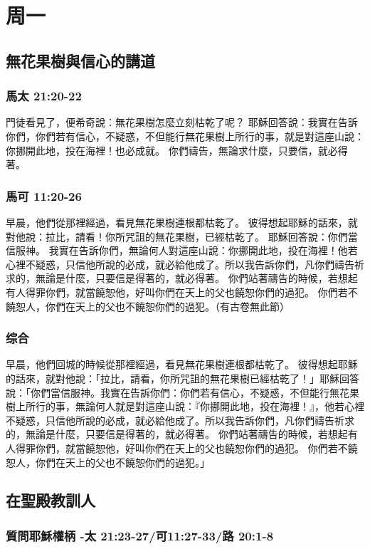 \section{周一}

\subsection{無花果樹與信心的講道}
\subsubsection{馬太 21:20-22}
門徒看見了，便希奇說：無花果樹怎麼立刻枯乾了呢？
耶穌回答說：我實在告訴你們，你們若有信心，不疑惑，不但能行無花果樹上所行的事，就是對這座山說：你挪開此地，投在海裡！也必成就。
你們禱告，無論求什麼，只要信，就必得著。
\subsubsection{馬可 11:20-26}
早晨，他們從那裡經過，看見無花果樹連根都枯乾了。
彼得想起耶穌的話來，就對他說：拉比，請看！你所咒詛的無花果樹，已經枯乾了。
耶穌回答說：你們當信服神。
我實在告訴你們，無論何人對這座山說：你挪開此地，投在海裡！他若心裡不疑惑，只信他所說的必成，就必給他成了。所以我告訴你們，凡你們禱告祈求的，無論是什麼，只要信是得著的，就必得著。
你們站著禱告的時候，若想起有人得罪你們，就當饒恕他，好叫你們在天上的父也饒恕你們的過犯。
你們若不饒恕人，你們在天上的父也不饒恕你們的過犯。（有古卷無此節）
\subsubsection{综合}
早晨，他們回城的時候從那裡經過，看見無花果樹連根都枯乾了。 彼得想起耶穌的話來，就對他說：「拉比，請看，你所咒詛的無花果樹已經枯乾了！」耶穌回答說：「你們當信服神。我實在告訴你們：你們若有信心，不疑惑，不但能行無花果樹上所行的事，無論何人就是對這座山說：『你挪開此地，投在海裡！』，他若心裡不疑惑，只信他所說的必成，就必給他成了。所以我告訴你們，凡你們禱告祈求的，無論是什麼，只要信是得著的，就必得著。 你們站著禱告的時候，若想起有人得罪你們，就當饒恕他，好叫你們在天上的父也饒恕你們的過犯。 你們若不饒恕人，你們在天上的父也不饒恕你們的過犯。」

\subsection{在聖殿教訓人}

\subsubsection{質問耶穌權柄 -太 21:23-27/可11:27-33/路 20:1-8}
